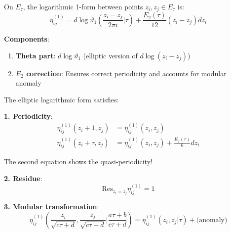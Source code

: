 \begin{definition}
\label{def:elliptic-log-form}
On $E_\tau$, the logarithmic 1-form between points $z_i, z_j \in E_\tau$ is:
\begin{equation}
\eta_{ij}^{(1)} = d \log \vartheta_1\left(\frac{z_i - z_j}{2\pi i} \bigg| \tau\right) 
+ \frac{E_2(\tau)}{12} (z_i - z_j) dz_i
\end{equation}

\textbf{Components}:
\begin{enumerate}
\item \textbf{Theta part}: $d\log\vartheta_1$ (elliptic version of $d\log(z_i - z_j)$)
\item \textbf{$E_2$ correction}: Ensures correct periodicity and accounts for modular anomaly
\end{enumerate}
\end{definition}

\begin{theorem}
\label{thm:eta-properties-genus1}
The elliptic logarithmic form satisfies:

\textbf{1. Periodicity}:
\begin{align}
\eta_{ij}^{(1)}(z_i + 1, z_j) &= \eta_{ij}^{(1)}(z_i, z_j) \\
\eta_{ij}^{(1)}(z_i + \tau, z_j) &= \eta_{ij}^{(1)}(z_i, z_j) + \frac{E_2(\tau)}{6} dz_i
\end{align}

The second equation shows the quasi-periodicity!

\textbf{2. Residue}:
\begin{equation}
\text{Res}_{z_i = z_j} \eta_{ij}^{(1)} = 1
\end{equation}

\textbf{3. Modular transformation}:
\begin{equation}
\eta_{ij}^{(1)}\left(\frac{z_i}{\sqrt{c\tau + d}}, \frac{z_j}{\sqrt{c\tau + d}} \bigg| \frac{a\tau+b}{c\tau+d}\right) 
= \eta_{ij}^{(1)}(z_i, z_j | \tau) + \text{(anomaly)}
\end{equation}
\end{theorem}


